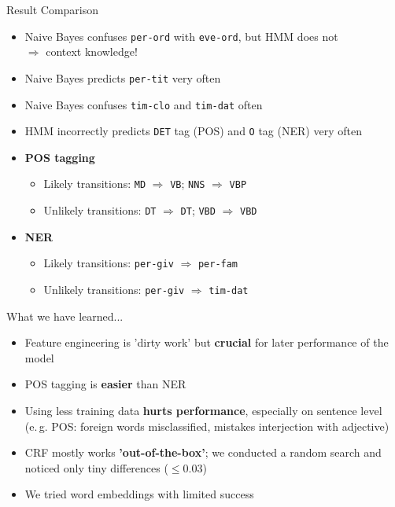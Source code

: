 \begin{frame}{Result Comparison}{}
	\begin{itemize}
		\item Naive Bayes confuses \texttt{per-ord} with \texttt{eve-ord}, but HMM does not \\
			$\Rightarrow$ context knowledge!
		\item Naive Bayes predicts \texttt{per-tit} very often
		\item Naive Bayes confuses \texttt{tim-clo} and \texttt{tim-dat} often
		\item HMM incorrectly predicts \texttt{DET} tag (POS) and \texttt{O} tag (NER) very often
		\item \textbf{POS tagging}
		\begin{itemize}
			\item Likely transitions: \texttt{MD} $\Rightarrow$ \texttt{VB}; \texttt{NNS} $\Rightarrow$ \texttt{VBP}
			\item Unlikely transitions: \texttt{DT} $\Rightarrow$ \texttt{DT}; \texttt{VBD} $\Rightarrow$ \texttt{VBD}
		\end{itemize}
		\item \textbf{NER}
		\begin{itemize}
			\item Likely transitions: \texttt{per-giv} $\Rightarrow$ \texttt{per-fam}
			\item Unlikely transitions: \texttt{per-giv} $\Rightarrow$ \texttt{tim-dat}
		\end{itemize}
	\end{itemize}
\end{frame}


\begin{frame}{What we have learned...}{}
	\begin{itemize}
		\item Feature engineering is 'dirty work' but \textbf{crucial} for later performance of the model
		\item POS tagging is \textbf{easier} than NER
		\item Using less training data \textbf{hurts performance}, especially on sentence level \\
			(e.\,g. POS: foreign words misclassified, mistakes interjection with adjective)
		\item CRF mostly works \textbf{'out-of-the-box'}; we conducted a random search and noticed only tiny differences 
			($\le 0.03$)
		\item We tried word embeddings with limited success
	\end{itemize}
\end{frame}


\makethanks

